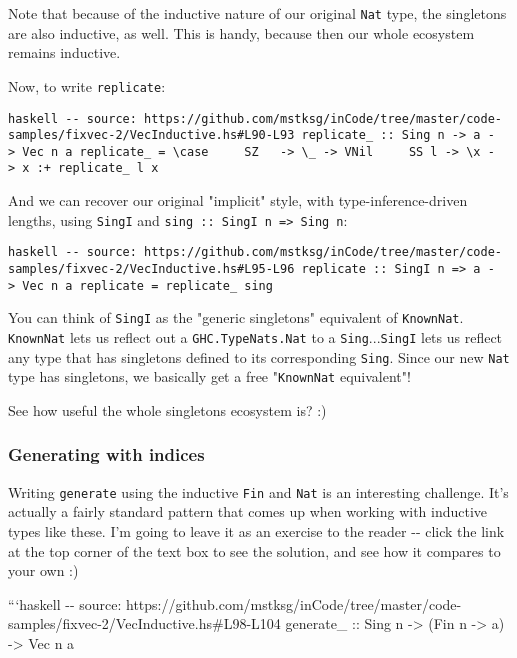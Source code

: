 \documentclass[]{article}
\begin{document}
Note that because of the inductive nature of our original \texttt{Nat} type, the
singletons are also inductive, as well. This is handy, because then our whole
ecosystem remains inductive.

Now, to write \texttt{replicate}:

\texttt{haskell\ -\/-\ source:\ https://github.com/mstksg/inCode/tree/master/code-samples/fixvec-2/VecInductive.hs\#L90-L93\ replicate\_\ ::\ Sing\ n\ -\textgreater{}\ a\ -\textgreater{}\ Vec\ n\ a\ replicate\_\ =\ \textbackslash{}case\ \ \ \ \ SZ\ \ \ -\textgreater{}\ \textbackslash{}\_\ -\textgreater{}\ VNil\ \ \ \ \ SS\ l\ -\textgreater{}\ \textbackslash{}x\ -\textgreater{}\ x\ :+\ replicate\_\ l\ x}

And we can recover our original "implicit" style, with type-inference-driven
lengths, using \texttt{SingI} and
\texttt{sing\ ::\ SingI\ n\ =\textgreater{}\ Sing\ n}:

\texttt{haskell\ -\/-\ source:\ https://github.com/mstksg/inCode/tree/master/code-samples/fixvec-2/VecInductive.hs\#L95-L96\ replicate\ ::\ SingI\ n\ =\textgreater{}\ a\ -\textgreater{}\ Vec\ n\ a\ replicate\ =\ replicate\_\ sing}

You can think of \texttt{SingI} as the "generic singletons" equivalent of
\texttt{KnownNat}. \texttt{KnownNat} lets us reflect out a
\texttt{GHC.TypeNats.Nat} to a \texttt{Sing}...\texttt{SingI} lets us reflect
any type that has singletons defined to its corresponding \texttt{Sing}. Since
our new \texttt{Nat} type has singletons, we basically get a free
"\texttt{KnownNat} equivalent"!

See how useful the whole singletons ecosystem is? :)

\subsubsection{Generating with indices}

Writing \texttt{generate} using the inductive \texttt{Fin} and \texttt{Nat} is
an interesting challenge. It's actually a fairly standard pattern that comes up
when working with inductive types like these. I'm going to leave it as an
exercise to the reader -\/- click the link at the top corner of the text box to
see the solution, and see how it compares to your own :)

```haskell -\/- source:
https://github.com/mstksg/inCode/tree/master/code-samples/fixvec-2/VecInductive.hs\#L98-L104
generate\_ :: Sing n -\textgreater{} (Fin n -\textgreater{} a) -\textgreater{}
Vec n a
\end{document}
